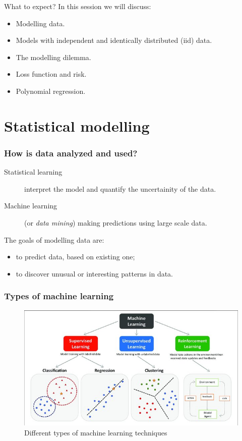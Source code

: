 \documentclass{beamer}
\begin{document}
\begin{frame}{What to expect?}
  In this session we will discuss:
  \begin{itemize}
    \item Modelling data.
    \item Models with independent and identically distributed (iid) data.
    \item The modelling dilemma.
    \item Loss function and risk.
    \item Polynomial regression.
  \end{itemize}
\end{frame}

\section{Statistical modelling}

\begin{frame}
\frametitle{How is data analyzed and used?}


\begin{description}
  \item [Statistical learning] interpret the model and quantify the uncertainity of the data.
  \item [Machine learning] (or {\em data mining}) making predictions using large scale data.
\end{description}

The goals of modelling data are:
\begin{itemize}
  \item to predict data, based on existing one;
  \item to discover unusual or interesting patterns in data. 
\end{itemize}

\end{frame}

\begin{frame}
  \frametitle{Types of machine learning}
    
    \begin{figure}
      \includegraphics[width=0.9\linewidth]{MLtypes}
      \caption{Different types of machine learning techniques\cite{peng_machine_2021}}
      \label{fig:MLtypes}
    \end{figure}
  
  \end{frame}
\end{document}
